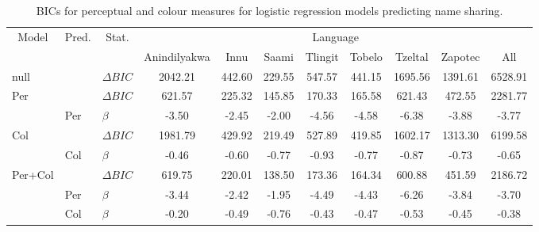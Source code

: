 \begin{table}[!h]

\caption{\label{tab:table:resultsLR}BICs for perceptual and colour measures for logistic regression models predicting name sharing.}
\centering
\begin{tabular}[t]{lllcccccccc}
\toprule
\multicolumn{1}{c}{Model} & \multicolumn{1}{c}{Pred.} & \multicolumn{1}{c}{Stat.} & \multicolumn{8}{c}{Language} \\
\cmidrule(l{3pt}r{3pt}){1-1} \cmidrule(l{3pt}r{3pt}){2-2} \cmidrule(l{3pt}r{3pt}){3-3} \cmidrule(l{3pt}r{3pt}){4-11}
  &    &     & Anindilyakwa & Innu & Saami & Tlingit & Tobelo & Tzeltal & Zapotec & All\\
\midrule
null &  & $\Delta BIC$ & 2042.21 & 442.60 & 229.55 & 547.57 & 441.15 & 1695.56 & 1391.61 & 6528.91\\
Per &  & $\Delta BIC$ & 621.57 & 225.32 & 145.85 & 170.33 & 165.58 & 621.43 & 472.55 & 2281.77\\
 & Per & $\beta$ & -3.50 & -2.45 & -2.00 & -4.56 & -4.58 & -6.38 & -3.88 & -3.77\\
Col &  & $\Delta BIC$ & 1981.79 & 429.92 & 219.49 & 527.89 & 419.85 & 1602.17 & 1313.30 & 6199.58\\
 & Col & $\beta$ & -0.46 & -0.60 & -0.77 & -0.93 & -0.77 & -0.87 & -0.73 & -0.65\\
Per+Col &  & $\Delta BIC$ & 619.75 & 220.01 & 138.50 & 173.36 & 164.34 & 600.88 & 451.59 & 2186.72\\
 & Per & $\beta$ & -3.44 & -2.42 & -1.95 & -4.49 & -4.43 & -6.26 & -3.84 & -3.70\\
 & Col & $\beta$ & -0.20 & -0.49 & -0.76 & -0.43 & -0.47 & -0.53 & -0.45 & -0.38\\
\bottomrule
\end{tabular}
\end{table}

